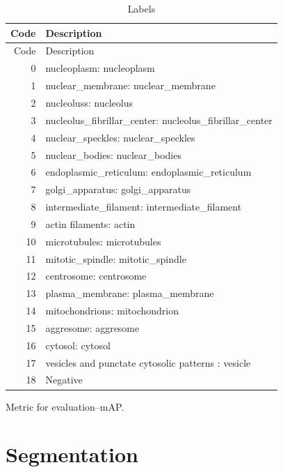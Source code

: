 \documentclass[]{article}
\begin{document}
\begin{longtable}{|r|p{ }|}
	\caption{Labels}\\  \hline
	Code&Description\\ \hline
	\endfirsthead
\hline	Code&Description\\ \hline
	\endhead
 0&\Gls{nucleoplasm}: \glsdesc{nucleoplasm} \\ \hline
 1&\Gls{nuclear_membrane}: \glsdesc{nuclear_membrane}\\ \hline
 2&\Glspl{nucleolus}: \glsdesc{nucleolus}\\ \hline
 3&\Gls{nucleolus_fibrillar_center}: \glsdesc{nucleolus_fibrillar_center}\\ \hline
 4&\Gls{nuclear_speckles}: \glsdesc{nuclear_speckles}\\ \hline
 5&\Gls{nuclear_bodies}: \glsdesc{nuclear_bodies}\\ \hline
 6&\Gls{endoplasmic_reticulum}: \glsdesc{endoplasmic_reticulum}\\ \hline
 7&\Gls{golgi_apparatus}: \glsdesc{golgi_apparatus}\\ \hline
 8&\Gls{intermediate_filament}: \glsdesc{intermediate_filament}\\ \hline
 9&\Gls{actin} filaments: \glsdesc{actin}\\\hline
 10&\Gls{microtubules}: \glsdesc{microtubules}\\\hline
 11&\Gls{mitotic_spindle}: \glsdesc{mitotic_spindle}\\\hline
 12&\Gls{centrosome}: \glsdesc{centrosome}\\\hline
 13&\Gls{plasma_membrane}: \glsdesc{plasma_membrane}\\\hline
 14&\Glspl{mitochondrion}: \glsdesc{mitochondrion}\\\hline
 15&\Gls{aggresome}: \glsdesc{aggresome}\\\hline
 16&\Gls{cytosol}: \glsdesc{cytosol}\\\hline
 17&\Glspl{vesicle} and \gls{punctate} cytosolic patterns : \glsdesc{vesicle}\\\hline
 18&Negative \\ \hline
\end{longtable}


Metric for evaluation--\gls{mAP}.

\section{Segmentation}
\end{document}
